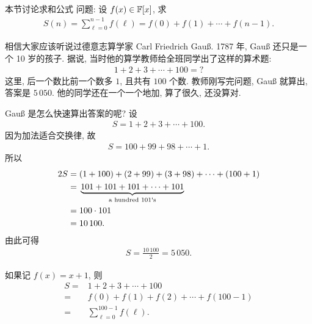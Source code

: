 \subsection*{\SummationFormulae}
\markright{\SummationFormulae}

本节讨论求和公式  问题: 设 $f(x) \in \mathbb{F}[x]$, 求
\begin{align*}
    S(n) = \sum_{\ell = 0}^{n - 1} f(\ell) = f(0) + f(1) + \cdots + f(n - 1).
\end{align*}

\begin{example}
    相信大家应该听说过德意志算学家 Carl Friedrich Gauß. 1787 年, Gauß 还只是一个 10 岁的孩子. 据说, 当时他的算学教师给全班同学出了这样的算术题:
    \begin{align*}
        1 + 2 + 3 + \cdots + 100 = ?
    \end{align*}
    这里, 后一个数比前一个数多 $1$, 且共有 $100$ 个数. 教师刚写完问题, Gauß 就算出, 答案是 $5\,050$. 他的同学还在一个一个地加, 算了很久, 还没算对.

    Gauß 是怎么快速算出答案的呢? 设
    \begin{align*}
        S = 1 + 2 + 3 + \cdots + 100.
    \end{align*}
    因为加法适合交换律, 故
    \begin{align*}
        S = 100 + 99 + 98 + \cdots + 1.
    \end{align*}
    所以
    \begin{align*}
        2S
        = {} & (1 + 100) + (2 + 99) + (3 + 98) + \cdots + (100 + 1) \\
        = {} & \underbrace{101 + 101 + 101 + \cdots + 101}
        _{\text{a hundred $101$\apostrophe s}}                      \\
        = {} & 100 \cdot 101                                        \\
        = {} & 10\,100.
    \end{align*}
    由此可得
    \begin{align*}
        S = \frac{10\,100}{2} = 5\,050.
    \end{align*}

    如果记 $f(x) = x + 1$, 则
    \begin{align*}
        S
        = {} & 1 + 2 + 3 + \cdots + 100                 \\
        = {} & f(0) + f(1) + f(2) + \cdots + f(100 - 1) \\
        = {} & \sum_{\ell = 0}^{100 - 1} f(\ell).
    \end{align*}


\end{example}
